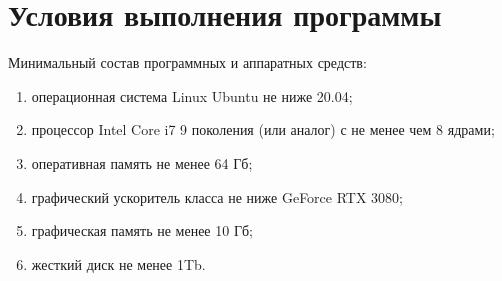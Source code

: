 \newpage
\section{Условия выполнения программы}

Минимальный состав программных и аппаратных средств:
\begin{enumerate}
  \item операционная система Linux Ubuntu не ниже 20.04;
  \item процессор Intel Core i7 9 поколения (или аналог) с не менее чем 8 ядрами;
  \item оперативная память не менее 64 Гб;
  \item графический ускоритель класса не ниже GeForce RTX 3080;
  \item графическая память не менее 10 Гб;
  \item жесткий диск не менее 1Tb.        
\end{enumerate}
